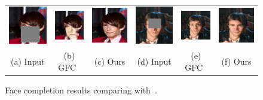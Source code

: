 \begin{figure}[!ht]
\begin{tabular}{cccccc}
\includegraphics[width=.16\textwidth]{figures/face/000197_input_image.jpg}&
\includegraphics[width=.16\textwidth]{figures/face/res3/res.jpg}&
\includegraphics[width=.16\textwidth]{figures/face/000197_synthesized_image.jpg}&
\includegraphics[width=.16\textwidth]{figures/face/000200_input_image.jpg}&
\includegraphics[width=.16\textwidth]{figures/face/res4/res.jpg}&
\includegraphics[width=.16\textwidth]{figures/face/000200_synthesized_image.jpg}\\
(a) Input & (b) GFC~\cite{li2017generative} & (c) Ours & (d) Input & (e) GFC~\cite{li2017generative} & (f) Ours \\
\end{tabular}
\caption{Face completion results comparing with~\cite{li2017generative}.}
\label{fig:face}
\vspace{-10pt}
\end{figure}  

